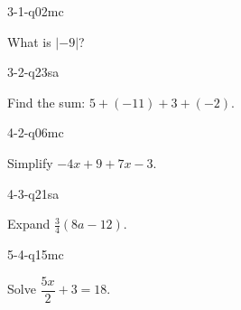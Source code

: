 \begin{practiceQuestion}{3-1-q02}{mc}
\begin{questionText}
What is $|-9|$?
\end{questionText}
\end{practiceQuestion}

\begin{practiceQuestion}{3-2-q23}{sa}
\begin{questionText}
Find the sum: $5 + (-11) + 3 + (-2)$.
\end{questionText}
\end{practiceQuestion}

\begin{practiceQuestion}{4-2-q06}{mc}
\begin{questionText}
Simplify $-4x + 9 + 7x - 3$.
\end{questionText}
\end{practiceQuestion}

\begin{practiceQuestion}{4-3-q21}{sa}
\begin{questionText}
Expand $\frac{3}{4}(8a - 12)$.


\end{questionText}
\end{practiceQuestion}

\begin{practiceQuestion}{5-4-q15}{mc}
\begin{questionText}
Solve $\dfrac{5x}{2} + 3 = 18$.
\end{questionText}
\end{practiceQuestion}

